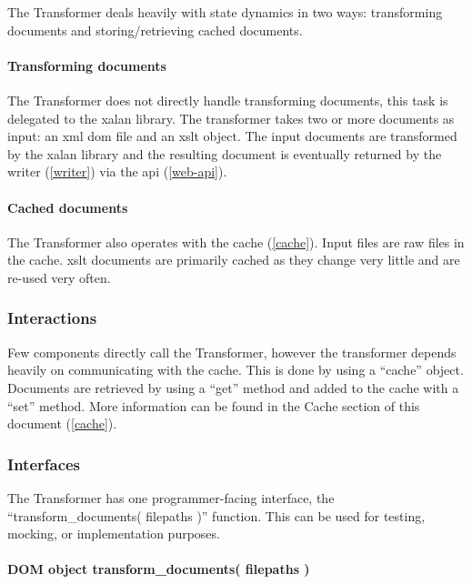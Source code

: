 \begin{enmerate}
The Transformer deals heavily with state dynamics in two ways: transforming documents and storing/retrieving cached documents.

\paragraph{Transforming documents}

The Transformer does not directly handle transforming documents, this task is delegated to the \gls{xalan} library. \cite{xalan-library}
The transformer takes two or more documents as input: an \gls{xml} \gls{dom} file and an \gls{xslt} object.
The input documents are transformed by the \gls{xalan} library and the resulting document is eventually returned by the writer (\ref{writer}) via the \gls{api} (\ref{web-api}).

\paragraph{Cached documents}

The Transformer also operates with the cache (\ref{cache}).
Input files are raw files in the cache.
\gls{xslt} documents are primarily cached as they change very little and are re-used very often.

\subsubsection{Interactions}

Few components directly call the Transformer, however the transformer depends heavily on communicating with the cache.
This is done by using a ``cache'' object.
Documents are retrieved by using a ``get'' method and added to the cache with a ``set'' method.
More information can be found in the Cache section of this document (\ref{cache}).

\subsubsection{Interfaces}

The Transformer has one programmer-facing interface, the ``transform\_documents( filepaths )'' function.
This can be used for testing, mocking, or implementation purposes.

\paragraph{DOM object transform\_documents( filepaths )}


\end{enmerate}

